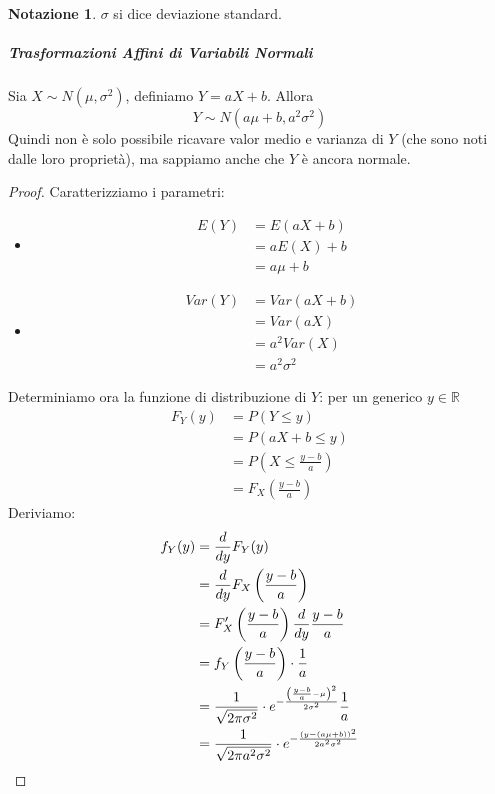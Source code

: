 \documentclass{article}
\theoremstyle{plain}
\theoremstyle{definition}
\newtheorem*{notazione}{Notazione}
\theoremstyle{remark}
\begin{document}
\begin{notazione}
	$\sigma$ si dice deviazione standard.
\end{notazione}
\subparagraph{Trasformazioni Affini di Variabili Normali} %
\label{subp:trasformazioni_affini_di_variabili_normali}
Sia $X\sim N(\mu,\sigma^2)$, definiamo $Y=aX+b$. Allora
\begin{equation*}
	Y\sim N(a\mu+b,a^2\sigma^2)
\end{equation*}
Quindi non è solo possibile ricavare valor medio e varianza di $Y$ (che sono noti dalle loro proprietà), ma sappiamo anche che $Y$ è ancora normale.
\begin{proof}
	Caratterizziamo i parametri:
	\begin{itemize}
		\item 
		\begin{align*}
			E(Y)&=E(aX+b)\\
			&=aE(X)+b\\
			&=a\mu+b
		\end{align*}
		\item
		\begin{align*}
			Var(Y)&=Var(aX+b)\\
			&=Var(aX)\\
			&=a^2Var(X)\\
			&=a^2\sigma^2
		\end{align*}
	\end{itemize}
	Determiniamo ora la funzione di distribuzione di $Y$: per un generico $y\in\mathds{R}$
	\begin{align*}
		F_Y(y)&=P(Y\leq y)\\
		&=P(aX+b\leq y)\\
		&=P\left(X\leq \frac{y-b}{a}\right)\\
		&=F_X\left(\frac{y-b}{a}\right)
	\end{align*}
	Deriviamo:
	\begin{align*}
		f_Y(y)&=\frac{d}{dy}F_Y(y)\\
		&=\frac{d}{dy}F_X\left(\frac{y-b}{a}\right)\\
		&=F_X'\left(\frac{y-b}{a}\right)\frac{d}{dy}\frac{y-b}{a}\\
		&=f_Y\left(\frac{y-b}{a}\right)\cdot\frac{1}{a}\\
		&=\frac{1}{\sqrt{2\pi\sigma^2}}\cdot e^{-\frac{\left(\frac{y-b}{a}-\mu\right)^2}{2\sigma^2}}\frac{1}{a}\\
		&=\frac{1}{\sqrt{2\pi a^2\sigma^2}}\cdot e^{-\frac{(y-(a\mu+b))^2}{2a^2\sigma^2}}\qedhere
	\end{align*}
\end{proof}
\end{document}
